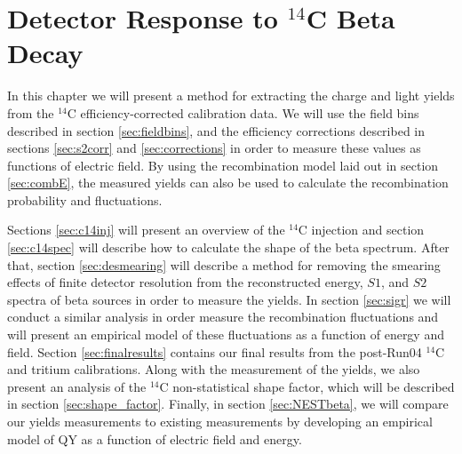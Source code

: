 \chapter{Detector Response to $^{14}$C Beta Decay}\label{chap:5}
In this chapter we will present a method for extracting the charge and light yields from the $^{14}$C efficiency-corrected calibration data. We will use the field bins described in section \ref{sec:fieldbins}, and the efficiency corrections described in sections \ref{sec:s2corr} and \ref{sec:corrections} in order to measure these values as functions of electric field. By using the recombination model laid out in section \ref{sec:combE}, the measured yields can also be used to calculate the recombination probability and fluctuations. 

Sections \ref{sec:c14inj} will present an overview of the $^{14}$C injection and section \ref{sec:c14spec} will describe how to calculate the shape of the beta spectrum. After that, section \ref{sec:desmearing} will describe a method for removing the smearing effects of finite detector resolution from the reconstructed energy, $S1$, and $S2$ spectra of beta sources in order to measure the yields. In section \ref{sec:sigr} we will conduct a similar analysis in order measure the recombination fluctuations and will present an empirical model of these fluctuations as a function of energy and field. Section \ref{sec:finalresults} contains our final results from the post-Run04 $^{14}$C and tritium calibrations. Along with the measurement of the yields, we also present an analysis of the $^{14}$C non-statistical shape factor, which will be described in section \ref{sec:shape_factor}. Finally, in section \ref{sec:NESTbeta}, we will compare our yields measurements to existing measurements by developing an empirical model of QY as a function of electric field and energy.

